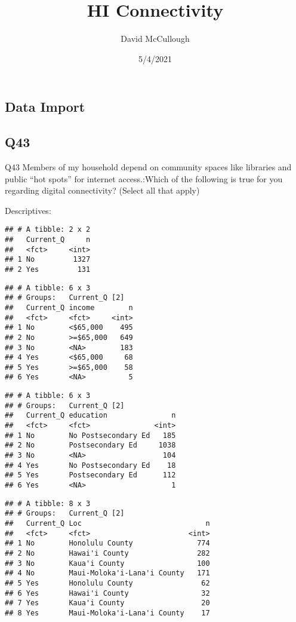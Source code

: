 \documentclass[]{article}
\title{HI Connectivity}
\author{David McCullough}
\date{5/4/2021}
\begin{document}
\maketitle

\hypertarget{data-import}{%
\subsection{Data Import}\label{data-import}}

\hypertarget{q43}{%
\subsection{Q43}\label{q43}}

Q43 Members of my household depend on community spaces like libraries
and public ``hot spots'' for internet access.:Which of the following is
true for you regarding digital connectivity? (Select all that apply)

Descriptives:

\begin{verbatim}
## # A tibble: 2 x 2
##   Current_Q     n
##   <fct>     <int>
## 1 No         1327
## 2 Yes         131
\end{verbatim}

\begin{verbatim}
## # A tibble: 6 x 3
## # Groups:   Current_Q [2]
##   Current_Q income        n
##   <fct>     <fct>     <int>
## 1 No        <$65,000    495
## 2 No        >=$65,000   649
## 3 No        <NA>        183
## 4 Yes       <$65,000     68
## 5 Yes       >=$65,000    58
## 6 Yes       <NA>          5
\end{verbatim}

\begin{verbatim}
## # A tibble: 6 x 3
## # Groups:   Current_Q [2]
##   Current_Q education               n
##   <fct>     <fct>               <int>
## 1 No        No Postsecondary Ed   185
## 2 No        Postsecondary Ed     1038
## 3 No        <NA>                  104
## 4 Yes       No Postsecondary Ed    18
## 5 Yes       Postsecondary Ed      112
## 6 Yes       <NA>                    1
\end{verbatim}

\begin{verbatim}
## # A tibble: 8 x 3
## # Groups:   Current_Q [2]
##   Current_Q Loc                             n
##   <fct>     <fct>                       <int>
## 1 No        Honolulu County               774
## 2 No        Hawai'i County                282
## 3 No        Kaua'i County                 100
## 4 No        Maui-Moloka'i-Lana'i County   171
## 5 Yes       Honolulu County                62
## 6 Yes       Hawai'i County                 32
## 7 Yes       Kaua'i County                  20
## 8 Yes       Maui-Moloka'i-Lana'i County    17
\end{verbatim}
\end{document}
